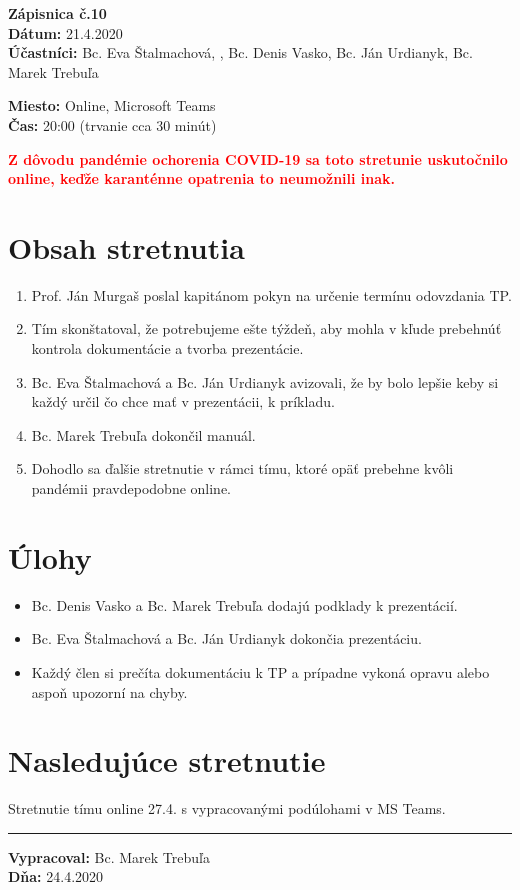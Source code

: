 
\usepackage{parskip}%
\usepackage[dvipsnames]{xcolor}

	\textbf{{\Huge Zápisnica č.10}}\\
			
	\textbf{Dátum:} 21.4.2020\\	
		
	\textbf{Účastníci:} Bc. Eva Štalmachová, , Bc. Denis Vasko, Bc. Ján Urdianyk, Bc. Marek Trebuľa

	\textbf{Miesto:} Online, Microsoft Teams\\	
	
	\textbf{Čas:} 20:00 (trvanie cca 30 minút)
	
	\textbf{\textcolor{red}{Z dôvodu pandémie ochorenia COVID-19 sa toto stretunie uskutočnilo online, keďže karanténne opatrenia to neumožnili inak.}}   
    \section*{Obsah stretnutia}
    \begin{enumerate}
    	\item Prof. Ján Murgaš poslal kapitánom pokyn na určenie termínu odovzdania TP.
    	\item Tím skonštatoval, že potrebujeme ešte týždeň, aby mohla v kľude prebehnúť kontrola dokumentácie a tvorba prezentácie.
    	\item Bc. Eva Štalmachová a Bc. Ján Urdianyk avizovali, že by bolo lepšie keby si každý určil čo chce mať v prezentácii, k príkladu.
    	\item Bc. Marek Trebuľa dokončil manuál.
    	\item Dohodlo sa ďalšie stretnutie v rámci tímu, ktoré opäť prebehne kvôli pandémii pravdepodobne online.
    \end{enumerate}    
    \section*{Úlohy}
    \begin{itemize}
    	\item Bc. Denis Vasko a Bc. Marek Trebuľa dodajú podklady k prezentácií.
    	\item Bc. Eva Štalmachová a Bc. Ján Urdianyk dokončia prezentáciu.
    	\item Každý člen si prečíta dokumentáciu k TP a prípadne vykoná opravu alebo aspoň upozorní na chyby. 
    \end{itemize}

    \section*{Nasledujúce stretnutie}
    
    Stretnutie tímu online 27.4. s vypracovanými podúlohami v MS Teams.

    
    \noindent\rule{15cm}{0.4pt}
   {\small 	\textbf{Vypracoval:} Bc. Marek Trebuľa\\
   \textbf{Dňa:} 24.4.2020 }
    

